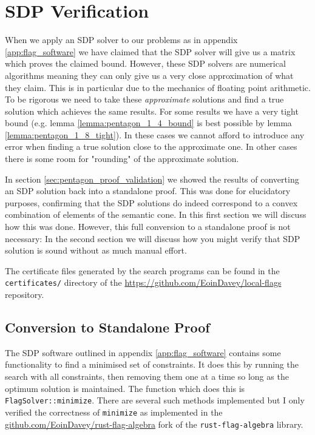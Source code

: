 \chapter{SDP Verification}
\label{app:sdp_verification}

When we apply an SDP solver to our problems as in appendix \ref{app:flag_software}
we have claimed that the SDP solver will give us a matrix which proves the claimed bound.
However, these SDP solvers are numerical algorithms meaning they can only give us a very
close approximation of what they claim. This is in particular due to the mechanics of
floating point arithmetic. To be rigorous we need to take these \textit{approximate}
solutions and find a true solution which achieves the same results.
For some results we have a very tight bound (e.g. lemma \ref{lemma:pentagon_1_4_bound}
is best possible by lemma \ref{lemma:pentagon_1_8_tight}). In these cases we cannot afford
to introduce any error when finding a true solution close to the approximate one. In
other cases there is some room for "rounding" of the approximate solution.

In section \ref{sec:pentagon_proof_validation} we showed the results of converting an
SDP solution back into a standalone proof. This was done for elucidatory purposes,
confirming that the SDP solutions do indeed correspond to a convex combination of elements
of the semantic cone. In this first section we will discuss how this was done.
However, this full conversion to a standalone proof is not necessary: In the second
section we will discuss how you might verify that SDP solution is sound without as much
manual effort.

The certificate files generated by the search programs can be found in the
\verb|certificates/| directory of the \url{https://github.com/EoinDavey/local-flags}
repository.

\section*{Conversion to Standalone Proof}

The SDP software outlined in appendix \ref{app:flag_software} contains some
functionality to find a minimised set of constraints. It does this by
running the search with all constraints, then removing them one at a time so long as
the optimum solution is maintained. The function which does this is
\verb|FlagSolver::minimize|. There are several such methods implemented but I
only verified the correctness of \verb|minimize| as implemented in the
\url{github.com/EoinDavey/rust-flag-algebra} fork of the \verb|rust-flag-algebra|
library.

